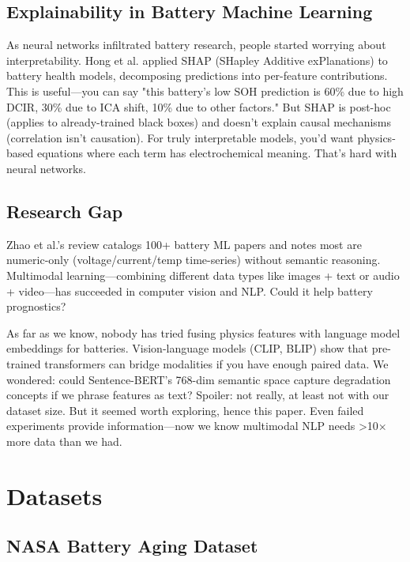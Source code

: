 \documentclass{sn-jnl}
\begin{document}
\subsection{Explainability in Battery Machine Learning}
\label{subsec:explainability}

As neural networks infiltrated battery research, people started worrying about interpretability. Hong et al. \citep{hong2020} applied SHAP (SHapley Additive exPlanations) to battery health models, decomposing predictions into per-feature contributions. This is useful—you can say "this battery's low SOH prediction is 60\% due to high DCIR, 30\% due to ICA shift, 10\% due to other factors." But SHAP is post-hoc (applies to already-trained black boxes) and doesn't explain causal mechanisms (correlation isn't causation). For truly interpretable models, you'd want physics-based equations where each term has electrochemical meaning. That's hard with neural networks.

\subsection{Research Gap}
\label{subsec:gap}

Zhao et al.'s review \citep{zhao2021} catalogs 100+ battery ML papers and notes most are numeric-only (voltage/current/temp time-series) without semantic reasoning. Multimodal learning—combining different data types like images + text or audio + video—has succeeded in computer vision and NLP. Could it help battery prognostics?

As far as we know, nobody has tried fusing physics features with language model embeddings for batteries. Vision-language models (CLIP, BLIP) show that pre-trained transformers can bridge modalities if you have enough paired data. We wondered: could Sentence-BERT's 768-dim semantic space capture degradation concepts if we phrase features as text? Spoiler: not really, at least not with our dataset size. But it seemed worth exploring, hence this paper. Even failed experiments provide information—now we know multimodal NLP needs >10× more data than we had.

\section{Datasets}
\label{sec:data}

\subsection{NASA Battery Aging Dataset}
\label{subsec:nasa}
\end{document}
